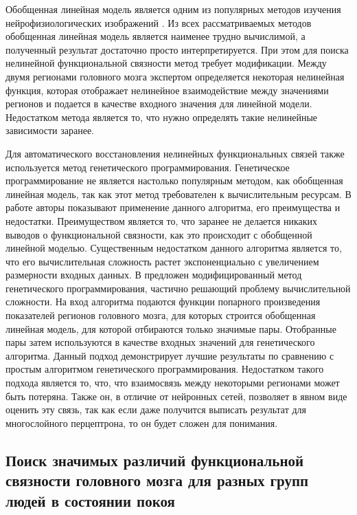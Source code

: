 Обобщенная линейная модель является одним из популярных методов изучения нейрофизиологических изображений \cite{lahaye2003functional, karanikolas2016multi}. Из всех рассматриваемых методов обобщенная линейная модель является наименее трудно вычислимой, а полученный результат достаточно просто интерпретируется. При этом для поиска нелинейной функциональной связности метод требует модификации. Между двумя регионами головного мозга экспертом определяется некоторая нелинейная функция, которая отображает нелинейное взаимодействие между значениями регионов и подается в качестве входного значения для линейной модели. Недостатком метода является то, что нужно определять такие нелинейные зависимости заранее.

Для автоматического восстановления нелинейных функциональных связей также используется метод генетического программирования. Генетическое программирование не является настолько популярным методом, как обобщенная линейная модель, так как этот метод требователен к вычислительным ресурсам. В работе \cite{allgaier2015nonlinear} авторы показывают применение данного алгоритма, его преимущества и недостатки. Преимуществом является то, что заранее не делается никаких выводов о функциональной связности, как это происходит с обобщенной линейной моделью. Существенным недостатком данного алгоритма является то, что его вычислительная сложность растет экспоненциально с увеличением размерности входных данных. В \cite{Icke2014} предложен модифицированный метод генетического программирования, частично решающий проблему вычислительной сложности. На вход алгоритма подаются функции попарного произведения показателей регионов головного мозга, для которых строится обобщенная линейная модель, для которой отбираются только значимые пары. Отобранные пары затем используются в качестве входных значений для генетического алгоритма. Данный подход демонстрирует лучшие результаты по сравнению с простым алгоритмом генетического программирования. Недостатком такого подхода является то, что, что взаимосвязь между некоторыми регионами может быть потеряна. Также он, в отличие от нейронных сетей, позволяет в явном виде оценить эту связь, так как если даже получится выписать результат для многослойного перцептрона, то он будет сложен для понимания.


\subsection{Поиск значимых различий  функциональной связности головного мозга для разных групп людей в состоянии покоя}


